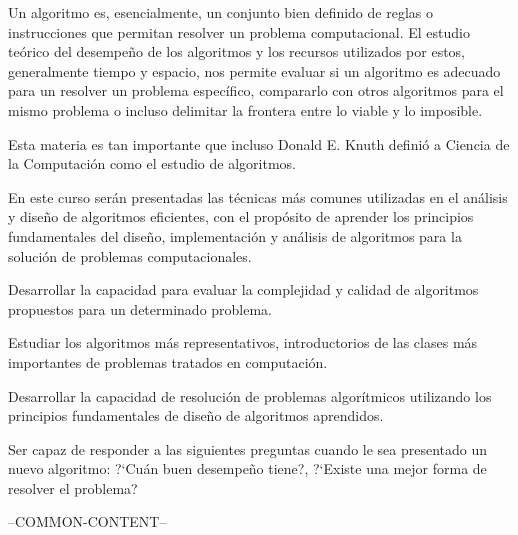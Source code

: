 \begin{syllabus}


\begin{justification}
    Un algoritmo es, esencialmente, un conjunto bien definido de reglas o instrucciones
    que permitan resolver un problema computacional. El estudio teórico del desempeño
    de los algoritmos y los recursos utilizados por estos, generalmente tiempo y espacio, 
    nos permite evaluar si un algoritmo es adecuado para un resolver un problema 
    específico, compararlo con otros algoritmos para el mismo problema o incluso
    delimitar la frontera entre lo viable y lo imposible.
    
    Esta materia es tan importante que incluso Donald E. Knuth definió a
    Ciencia de la Computación como el estudio de algoritmos.
    
    En este curso serán presentadas las técnicas más comunes utilizadas en el análisis y diseño de 
    algoritmos eficientes, con el propósito de aprender los principios fundamentales
    del diseño, implementación y análisis de algoritmos para la solución de problemas
    computacionales.
    \end{justification}
    
    \begin{goals} 
    \item Desarrollar la capacidad para evaluar la complejidad y calidad de algoritmos propuestos para un determinado problema.
    \item Estudiar los algoritmos más representativos, introductorios de las clases más importantes de problemas tratados en computación.
    \item Desarrollar la capacidad de resolución de problemas algorítmicos utilizando los principios fundamentales de diseño de algoritmos aprendidos.
    \item Ser capaz de responder a las siguientes preguntas cuando le sea presentado un nuevo algoritmo: ?`Cuán buen desempeño tiene?, ?`Existe una mejor forma de resolver el problema?
    \end{goals}
    
    --COMMON-CONTENT--
    

\end{syllabus}
